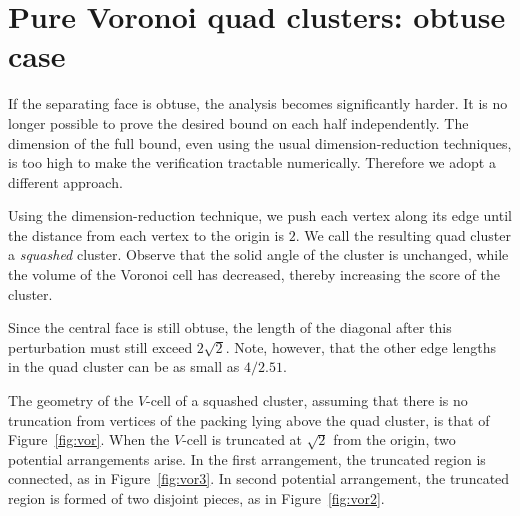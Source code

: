 \section{Pure Voronoi quad clusters:  obtuse case}
If the separating face is obtuse, the analysis becomes significantly
harder.  It is no longer possible to prove the desired bound on each
half independently.  The dimension of the full bound, even using
the usual dimension-reduction techniques, is too high to make the
verification tractable numerically.  Therefore we adopt a different
approach.

Using the dimension-reduction technique, we push each vertex along its
edge until the distance from each vertex to the origin is $2$.
We call the resulting quad cluster a {\em squashed} cluster.  Observe
that the solid angle of the cluster is unchanged, while the volume of
the Voronoi cell has decreased, thereby increasing the score of the
cluster.

Since
the central face is still obtuse, the length of the diagonal after
this perturbation must still exceed $2\sqrt{2}$.  Note, however,
that the other edge lengths in the quad cluster can be as small as
$4/2.51$.

The geometry of the $V$-cell of a squashed cluster, assuming that
there is no truncation from vertices of the packing lying above the quad
cluster, is that of Figure~\ref{fig:vor}.  When the $V$-cell is
truncated at $\sqrt{2}$ from the origin, two potential arrangements
arise.  In the first arrangement, the truncated region is connected,
as in Figure~\ref{fig:vor3}.  In second potential arrangement, the
truncated region is formed of two disjoint pieces,
as in Figure~\ref{fig:vor2}.

